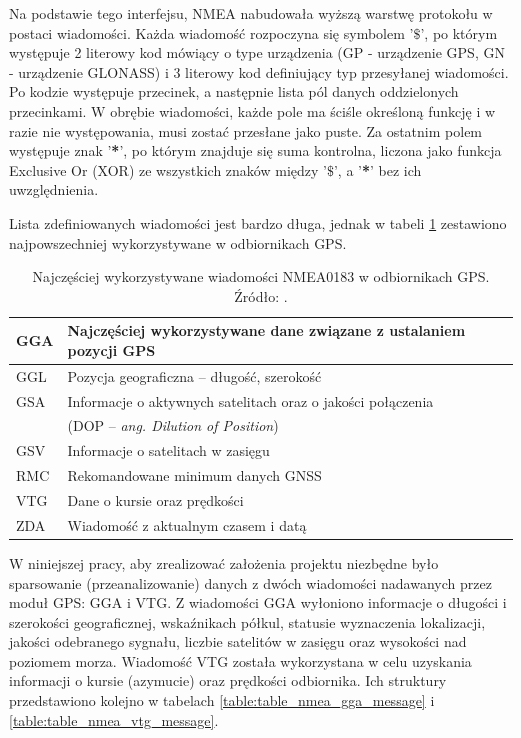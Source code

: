 Na podstawie tego interfejsu, NMEA nabudowała wyższą warstwę protokołu w postaci wiadomości. Każda wiadomość rozpoczyna się symbolem '\textbf{$\$$}', po którym występuje 2 literowy kod mówiący o type urządzenia (GP - urządzenie GPS, GN - urządzenie GLONASS) i 3 literowy kod definiujący typ przesyłanej wiadomości. Po kodzie występuje przecinek, a następnie lista pól danych oddzielonych przecinkami. W obrębie wiadomości, każde pole ma ściśle określoną funkcję i w razie nie występowania, musi zostać przesłane jako puste. Za ostatnim polem występuje znak '\textbf{*}', po którym znajduje się suma kontrolna, liczona jako funkcja Exclusive Or (XOR) ze wszystkich znaków między '\textbf{$\$$}', a '\textbf{*}' bez ich uwzględnienia. 

Lista zdefiniowanych wiadomości jest bardzo długa, jednak w tabeli \ref{table:table_nmea_messages} zestawiono najpowszechniej wykorzystywane w odbiornikach GPS.

\begin{table}[H]
\centering
\caption{Najczęściej wykorzystywane wiadomości NMEA0183 w odbiornikach GPS.\\ Źródło: \cite{inzynierka}.}
\label{table:table_nmea_messages}
\begin{tabular}{| l | l |}
\hline
GGA & Najczęściej wykorzystywane dane związane z ustalaniem pozycji GPS \\  \hline
GGL & Pozycja geograficzna – długość, szerokość \\  \hline
GSA & Informacje o aktywnych satelitach oraz o jakości połączenia \\ 
    & (DOP – \textit{ang.    Dilution of Position}) \\ \hline
GSV & Informacje o satelitach w zasięgu \\ \hline
RMC & Rekomandowane minimum danych GNSS \\ \hline
VTG & Dane o kursie oraz prędkości \\ \hline
ZDA & Wiadomość z aktualnym czasem i datą \\ \hline
\end{tabular}
\end{table}

W niniejszej pracy, aby zrealizować założenia projektu niezbędne było sparsowanie (przeanalizowanie) danych z dwóch wiadomości nadawanych przez moduł GPS: GGA i VTG.
Z wiadomości GGA  wyłoniono informacje o długości i szerokości geograficznej, wskaźnikach półkul, statusie wyznaczenia lokalizacji, jakości odebranego sygnału, liczbie satelitów w zasięgu oraz wysokości nad poziomem morza. Wiadomość VTG została wykorzystana w celu uzyskania informacji o kursie (azymucie) oraz prędkości odbiornika. Ich struktury przedstawiono kolejno w tabelach \ref{table:table_nmea_gga_message} i \ref{table:table_nmea_vtg_message}.

